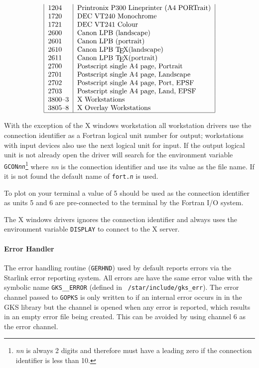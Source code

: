 \begin{table}
\[\begin{tabular}{|l|l|}
1204    & Printronix P300 Lineprinter (A4 PORTrait) \\
1720    & DEC VT240 Monochrome \\
1721    & DEC VT241 Colour \\
2600    & Canon LPB (landscape) \\
2601    & Canon LPB (portrait) \\
2610    & Canon LPB \TeX (landscape) \\
2611    & Canon LPB \TeX (portrait) \\
2700    & Postscript single A4 page, Portrait \\
2701    & Postscript single A4 page, Landscape \\
2702    & Postscript single A4 page, Port, EPSF \\
2703    & Postscript single A4 page, Land, EPSF  \\
3800--3    & X Workstations \\
3805--8    & X Overlay Workstations\\
\hline
\end{tabular}\]\end{table}

With the exception of the X windows workstation all workstation drivers use the
connection identifier as a Fortran logical unit number for output; workstations
with input devices also use the next logical unit for input. If the output
logical unit is not already open the driver will search for the environment
variable {\tt GCON{\em nn}}\footnote{{\em nn} is always 2 digits and therefore
must have a leading zero if the connection identifier is less than 10.} where
{\em nn} is the connection identifier and use its value as the file name. If it
is not found the default name of {\tt fort.{\em n}} is used.

To plot on your terminal a value of 5 should be used as the connection
identifier as units 5 and 6 are pre-connected to the terminal by the Fortran
I/O system.

The X windows drivers ignores the connection identifier and always uses the
environment variable {\tt DISPLAY} to connect to the X server.

\paragraph{Error Handler}

The error handling routine ({\tt GERHND}) used by default reports errors via
the Starlink error reporting system. All errors are have the same error value
with the symbolic name {\tt GKS\_\_ERROR} (defined in {\tt
/star/include/gks\_err}). The error channel passed to {\tt GOPKS} is only
written to if an internal error occurs in in the GKS library but the channel is
opened when any error is reported, which results in an empty error file
being created. This can be avoided by using channel 6 as the error channel.

